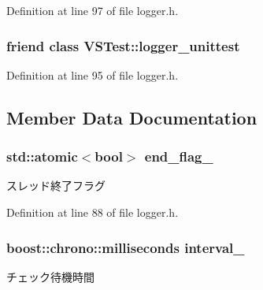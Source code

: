 \-Definition at line 97 of file logger.\-h.

\hypertarget{classyuh_1_1detail_1_1logger_a697b2e01800239e686ae61d7129fb769}{
\subsubsection[{\-V\-S\-Test\-::logger\-\_\-unittest}]{\setlength{\rightskip}{0pt plus 5cm}friend class \-V\-S\-Test\-::logger\-\_\-unittest}}\label{d1/dce/classyuh_1_1detail_1_1logger_a697b2e01800239e686ae61d7129fb769}


\-Definition at line 95 of file logger.\-h.



\subsection{\-Member \-Data \-Documentation}
\hypertarget{classyuh_1_1detail_1_1logger_a91290cb294b9bbefd56c3a97bf00dcab}{
\subsubsection[{end\-\_\-flag\-\_\-}]{\setlength{\rightskip}{0pt plus 5cm}std\-::atomic$<$bool$>$ {\bf end\-\_\-flag\-\_\-}}}\label{d1/dce/classyuh_1_1detail_1_1logger_a91290cb294b9bbefd56c3a97bf00dcab}
スレッド終了フラグ 

\-Definition at line 88 of file logger.\-h.

\hypertarget{classyuh_1_1detail_1_1logger_a2ae4364eadd2ae03f6ffb965d0622d21}{
\subsubsection[{interval\-\_\-}]{\setlength{\rightskip}{0pt plus 5cm}boost\-::chrono\-::milliseconds {\bf interval\-\_\-}}}\label{d1/dce/classyuh_1_1detail_1_1logger_a2ae4364eadd2ae03f6ffb965d0622d21}
チェック待機時間 

